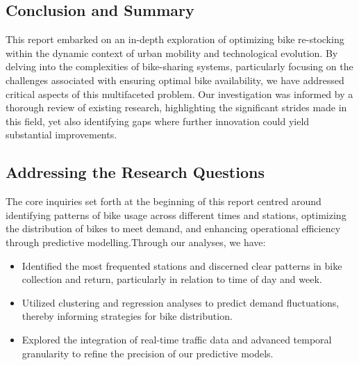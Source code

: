 \subsection{Conclusion and Summary}\label{subsec:summary}

This report embarked on an in-depth exploration of optimizing bike re-stocking within the dynamic context of urban mobility and technological evolution.
By delving into the complexities of bike-sharing systems, particularly focusing on the challenges associated with ensuring optimal bike availability, we have addressed critical aspects of this multifaceted problem.
Our investigation was informed by a thorough review of existing research, highlighting the significant strides made in this field, yet also identifying gaps where further innovation could yield substantial improvements.

\subsection{Addressing the Research Questions}\label{subsec:addressing-the-research-questions}
The core inquiries set forth at the beginning of this report centred around identifying patterns of bike usage across different times and stations, optimizing the distribution of bikes to meet demand, and enhancing operational efficiency through predictive modelling.\newline Through our analyses, we have:\newline
\begin{itemize}
    \item Identified the most frequented stations and discerned clear patterns in bike collection and return, particularly in relation to time of day and week.
    \item Utilized clustering and regression analyses to predict demand fluctuations, thereby informing strategies for bike distribution.
    \item Explored the integration of real-time traffic data and advanced temporal granularity to refine the precision of our predictive models.
\end{itemize}

